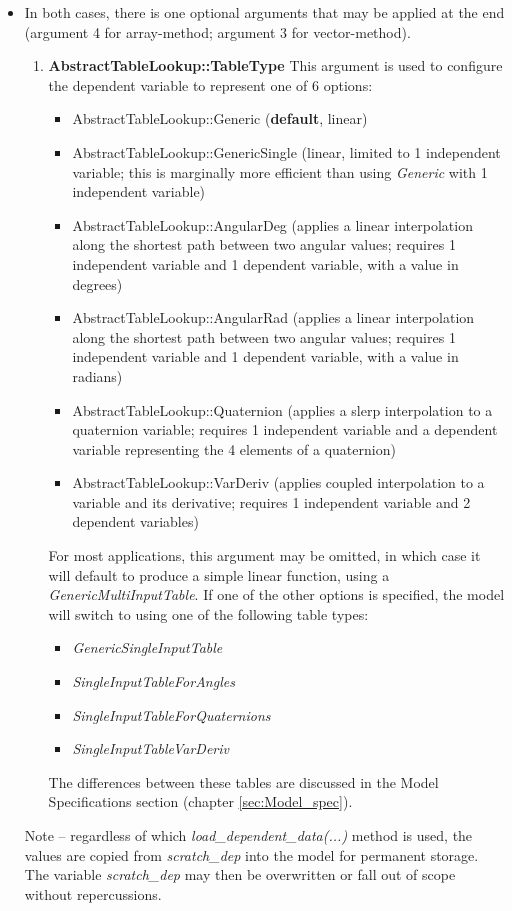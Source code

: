 \documentclass[11pt,fleqn]{report}
\begin{document}
\begin{itemize}
\item In both cases, there is one optional arguments that may be applied
 at the end (argument 4 for array-method; argument 3 for vector-method).
\begin{enumerate}
 \item \textbf{AbstractTableLookup::TableType}
 This argument is used to configure the dependent variable to represent one of
 6 options:
  \begin{itemize}
   \item AbstractTableLookup::Generic (\textbf{default}, linear)
   \item AbstractTableLookup::GenericSingle (linear, limited to 1 independent
   variable; this is marginally more efficient than using \textit{Generic} with
   1 independent variable)
   \item AbstractTableLookup::AngularDeg (applies a linear interpolation along
   the shortest path between two angular values; requires 1 independent
   variable and 1 dependent variable, with a value in degrees)
   \item AbstractTableLookup::AngularRad (applies a linear interpolation along
   the shortest path between two angular values; requires 1 independent
   variable and 1 dependent variable, with a value in radians)
   \item AbstractTableLookup::Quaternion (applies a slerp interpolation to a
   quaternion variable; requires 1 independent variable and a dependent
   variable representing the 4 elements of a quaternion)
   \item AbstractTableLookup::VarDeriv (applies coupled interpolation to a
   variable and its derivative; requires 1 independent variable and 2 dependent
   variables)
  \end{itemize}

 For most applications, this argument may be omitted, in which case it will
 default to produce a simple linear function, using a
 \textit{GenericMultiInputTable}.
 If one of the other options is specified, the model will switch to using
 one of the following table types:
 \begin{itemize}
 \item \textit{GenericSingleInputTable}
 \item \textit{SingleInputTableForAngles}
 \item \textit{SingleInputTableForQuaternions}
 \item \textit{SingleInputTableVarDeriv}
 \end{itemize}
 The differences between these tables are discussed in
 the Model Specifications section (chapter \ref{sec:Model_spec}).
\end{enumerate}

Note -- regardless of which \textit{load\_dependent\_data(...)} method is used,
        the values are copied from \textit{scratch\_dep} into the model for
        permanent storage.  The variable \textit{scratch\_dep} may then
        be overwritten or fall out of scope without repercussions.
\end{itemize}
\end{document}
